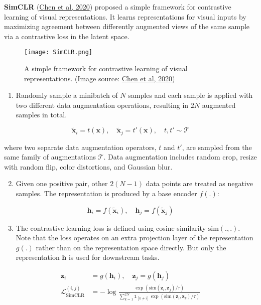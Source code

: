 \documentclass[12pt]{article}
\begin{document}
\textbf{SimCLR} (\href{https://arxiv.org/abs/2002.05709}{Chen et al, 2020}) proposed a simple framework for contrastive learning of visual representations. It learns representations for visual inputs by maximizing agreement between differently augmented views of the same sample via a contrastive loss in the latent space.

\begin{figure}[H]
    \centering
    \texttt{[image: SimCLR.png]}
    \caption{A simple framework for contrastive learning of visual representations. (Image source: \href{https://arxiv.org/abs/2002.05709}{Chen et al, 2020})}
\end{figure}

\begin{enumerate}
    \item Randomly sample a minibatch of $N$ samples and each sample is applied with two different data augmentation operations, resulting in $2N$ augmented samples in total.
\end{enumerate}

\[
\tilde{\mathbf{x}}_i = t(\mathbf{x}),\quad\tilde{\mathbf{x}}_j = t'(\mathbf{x}),\quad t, t' \sim \mathcal{T}
\]

where two separate data augmentation operators, $t$ and $t'$, are sampled from the same family of augmentations $\mathcal{T}$. Data augmentation includes random crop, resize with random flip, color distortions, and Gaussian blur.

\begin{enumerate}
    \setcounter{enumi}{1}
    \item Given one positive pair, other $2(N-1)$ data points are treated as negative samples. The representation is produced by a base encoder $f(.)$:
\end{enumerate}

\[
\mathbf{h}_i = f(\tilde{\mathbf{x}}_i),\quad \mathbf{h}_j = f(\tilde{\mathbf{x}}_j)
\]

\begin{enumerate}
    \setcounter{enumi}{2}
    \item The contrastive learning loss is defined using cosine similarity $\text{sim}(.,.)$. Note that the loss operates on an extra projection layer of the representation $g(.)$ rather than on the representation space directly. But only the representation $\mathbf{h}$ is used for downstream tasks.
\end{enumerate}

\[
\begin{aligned}
\mathbf{z}_i &= g(\mathbf{h}_i),\quad
\mathbf{z}_j = g(\mathbf{h}_j) \\
\mathcal{L}_\text{SimCLR}^{(i,j)} &= - \log\frac{\exp(\text{sim}(\mathbf{z}_i, \mathbf{z}_j) / \tau)}{\sum_{k=1}^{2N} \mathbb{1}_{[k \neq i]} \exp(\text{sim}(\mathbf{z}_i, \mathbf{z}_k) / \tau)}
\end{aligned}
\]
\end{document}
